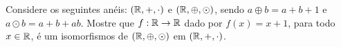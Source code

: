 \documentclass[12pt]{exam}
\begin{document}
\vspace{.3cm}

\questao{} Considere os seguintes anéis: $(\mathbb{R}, +, \cdot)$ e $(\mathbb{R}, \oplus, \odot)$, sendo $a \oplus b = a + b + 1$ e $a \odot b = a + b + ab$. Mostre que $f : \mathbb{R} \to \mathbb{R}$ dado por $f(x) = x + 1$, para todo $x \in \mathbb{R}$, é um isomorfismos de $(\mathbb{R}, \oplus, \odot)$ em $(\mathbb{R}, +, \cdot)$.

\vspace{.3cm}












\end{document}
